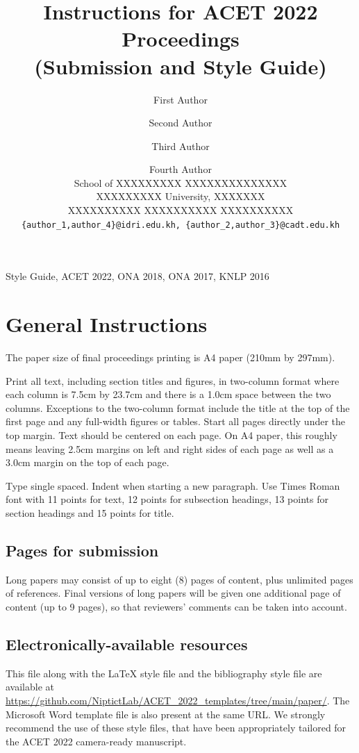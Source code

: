 \documentclass[11pt,a4paper]{article}
\title{Instructions for ACET 2022 Proceedings\\(Submission and Style Guide)}
\author{First Author\affilA \and Second Author\affilB \and Third Author\affilB \and Fourth Author\affilA\\
\affilA School of XXXXXXXXX  XXXXXXXXXXXXXX \\
XXXXXXXXX University, XXXXXXX \\
\affilB XXXXXXXXXX XXXXXXXXXX XXXXXXXXXX \\
{\tt \{author\_1,author\_4\}@idri.edu.kh,  \{author\_2,author\_3\}@cadt.edu.kh}}
\begin{document}
\maketitle

\medskip
{} Style Guide, ACET 2022, ONA 2018, ONA 2017, KNLP 2016

\section{General Instructions}

The paper size of final proceedings printing is A4 paper (210mm by
297mm).

Print all text, including section titles and figures, in two-column
format where each column is 7.5cm by 23.7cm and there is a 1.0cm space
between the two columns.  Exceptions to the two-column format include
the title at the top of the first page and any full-width figures or
tables.  Start all pages directly under the top margin.  Text should be
centered on each page.  On A4 paper, this roughly means leaving 2.5cm
margins on left and right sides of each page as well as a 3.0cm margin
on the top of each page.

Type single spaced.  Indent when starting a new paragraph.  Use Times
Roman font with 11 points for text, 12 points for subsection headings,
13 points for section headings and 15 points for title.

\subsection{Pages for submission}

Long papers may consist of up to eight (8) pages of content, plus unlimited pages of references. Final versions of long papers will be given one additional page of content (up to 9 pages), so that reviewers’ comments can be taken into account.

\subsection{Electronically-available resources}

This file along with the \LaTeX{} style file and the bibliography style file are available at \url{https://github.com/NiptictLab/ACET_2022_templates/tree/main/paper/}. The Microsoft Word template file is also present at the same URL.  We strongly recommend the use of these style files, that have been appropriately tailored for the ACET 2022 camera-ready manuscript.
\end{document}
